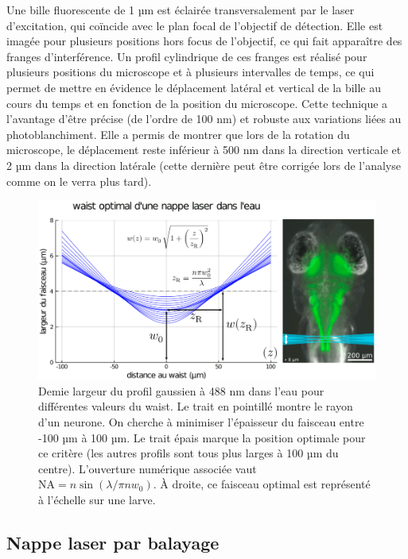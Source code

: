 Une bille fluorescente de 1 µm est éclairée transversalement par le laser d'excitation, qui coïncide avec le plan focal de l'objectif de détection. Elle est imagée pour plusieurs positions hors focus de l'objectif, ce qui fait apparaître des franges d'interférence. Un profil cylindrique de ces franges est réalisé pour plusieurs positions du microscope et à plusieurs intervalles de temps, ce qui permet de mettre en évidence le déplacement latéral et vertical de la bille au cours du temps et en fonction de la position du microscope. Cette technique a l'avantage d'être précise (de l'ordre de 100 nm) et robuste aux variations liées au photoblanchiment. Elle a permis de montrer que lors de la rotation du microscope, le déplacement reste inférieur à 500 nm dans la direction verticale et 2 µm dans la direction latérale (cette dernière peut être corrigée lors de l'analyse comme on le verra plus tard).

\begin{figure}[b!]
    \centering
    \includegraphics[width=\textwidth]{./files/optimal_waist.svg.png}
    \caption{Demie largeur du profil gaussien à 488 nm dans l'eau pour différentes valeurs du waist. Le trait en pointillé montre le rayon d'un neurone. On cherche à minimiser l'épaisseur du faisceau entre -100 µm à 100 µm. Le trait épais marque la position optimale pour ce critère (les autres profils sont tous plus larges à 100 µm du centre). L'ouverture numérique associée vaut $ \mathrm{NA} = n\sin(\lambda/\pi n w_0) $. À droite, ce faisceau optimal est représenté à l'échelle sur une larve.
    \label{FIGoptimalwaist}}
    \end{figure}


\subsection{Nappe laser par balayage}

